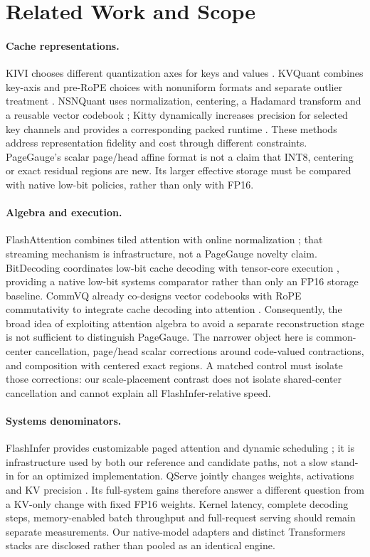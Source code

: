 \section{Related Work and Scope}
\paragraph{Cache representations.}
KIVI chooses different quantization axes for keys and values
\citep{liu2024kivi}. KVQuant combines key-axis and pre-RoPE choices with
nonuniform formats and separate outlier treatment \citep{hooper2024kvquant}.
NSNQuant uses normalization, centering, a Hadamard transform and a reusable
vector codebook \citep{son2025nsnquant}; Kitty dynamically increases precision
for selected key channels and provides a corresponding packed runtime
\citep{xia2026kitty}. These methods address representation fidelity and cost
through different constraints. PageGauge's scalar page/head affine format is
not a claim that INT8, centering or exact residual regions are new. Its larger
effective storage must be compared with native low-bit policies, rather than
only with FP16.

\paragraph{Algebra and execution.}
FlashAttention combines tiled attention with online normalization
\citep{dao2022flashattention}; that streaming mechanism is infrastructure,
not a PageGauge novelty claim. BitDecoding coordinates low-bit cache decoding
with tensor-core execution \citep{du2026bitdecoding}, providing a native
low-bit systems comparator rather than only an FP16 storage baseline.
CommVQ already co-designs vector codebooks with RoPE commutativity to integrate
cache decoding into attention \citep{li2025commvq}. Consequently, the broad
idea of exploiting attention algebra to avoid a separate reconstruction stage
is not sufficient to distinguish PageGauge. The narrower object here is
common-center cancellation, page/head scalar corrections around code-valued
contractions, and composition with centered exact regions. A matched control
must isolate those corrections: our scale-placement contrast does not isolate
shared-center cancellation and cannot explain all FlashInfer-relative speed.

\paragraph{Systems denominators.}
FlashInfer provides customizable paged attention and dynamic scheduling
\citep{ye2025flashinfer}; it is infrastructure used by both our reference and
candidate paths, not a slow stand-in for an optimized implementation. QServe
jointly changes weights, activations and KV precision \citep{lin2025qserve}.
Its full-system gains therefore answer a different question from a KV-only
change with fixed FP16 weights. Kernel latency, complete decoding steps,
memory-enabled batch throughput and full-request serving should remain
separate measurements. Our native-model adapters and distinct Transformers
stacks are disclosed rather than pooled as an identical engine.

